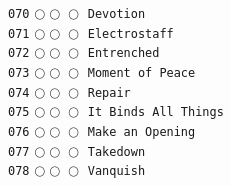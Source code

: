 \documentclass[a4paper,landscape]{article}
\begin{document}
\begin{multicols*}{5}
\texttt{070} \(\bigcirc\!\bigcirc\!\bigcirc\)  \texttt{Devotion} \vspace{-0.3mm}\\ 
\texttt{071} \(\bigcirc\!\bigcirc\!\bigcirc\)  \texttt{Electrostaff} \vspace{-0.3mm}\\ 
\texttt{072} \(\bigcirc\!\bigcirc\!\bigcirc\)  \texttt{Entrenched} \vspace{-0.3mm}\\ 
\texttt{073} \(\bigcirc\!\bigcirc\!\bigcirc\)  \texttt{Moment of Peace} \vspace{-0.3mm}\\ 
\texttt{074} \(\bigcirc\!\bigcirc\!\bigcirc\)  \texttt{Repair} \vspace{-0.3mm}\\ 
\texttt{075} \(\bigcirc\!\bigcirc\!\bigcirc\)  \texttt{It Binds All Things} \vspace{-0.3mm}\\ 
\texttt{076} \(\bigcirc\!\bigcirc\!\bigcirc\)  \texttt{Make an Opening} \vspace{-0.3mm}\\ 
\texttt{077} \(\bigcirc\!\bigcirc\!\bigcirc\)  \texttt{Takedown} \vspace{-0.3mm}\\ 
\texttt{078} \(\bigcirc\!\bigcirc\!\bigcirc\)  \texttt{Vanquish} \vspace{-0.3mm}\\ 

\end{multicols*}
\end{document}
